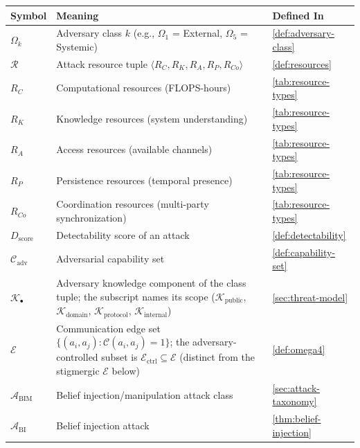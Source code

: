 \documentclass[
]{article}
\newcounter{none} %
\begin{document}
{\def\LTcaptype{none} %
\begin{longtable}[]{@{}
  >{\raggedright\arraybackslash}p{}
  >{\raggedright\arraybackslash}p{}
  >{\raggedright\arraybackslash}p{}@{}}
\toprule\noalign{}
\begin{minipage}[b]{\linewidth}\raggedright
Symbol
\end{minipage} & \begin{minipage}[b]{\linewidth}\raggedright
Meaning
\end{minipage} & \begin{minipage}[b]{\linewidth}\raggedright
Defined In
\end{minipage} \\
\midrule\noalign{}
\endhead
\bottomrule\noalign{}
\endlastfoot
\(\Omega_k\) & Adversary class \(k\) (e.g., \(\Omega_1\) = External,
\(\Omega_5\) = Systemic) & \cref{def:adversary-class} \\
\(\mathcal{R}\) & Attack resource tuple
\(\langle R_C, R_K, R_A, R_P, R_{Co} \rangle\) & \cref{def:resources} \\
\(R_C\) & Computational resources (FLOPS-hours) &
\cref{tab:resource-types} \\
\(R_K\) & Knowledge resources (system understanding) &
\cref{tab:resource-types} \\
\(R_A\) & Access resources (available channels) &
\cref{tab:resource-types} \\
\(R_P\) & Persistence resources (temporal presence) &
\cref{tab:resource-types} \\
\(R_{Co}\) & Coordination resources (multi-party synchronization) &
\cref{tab:resource-types} \\
\(D_{\text{score}}\) & Detectability score of an attack &
\cref{def:detectability} \\
\(\mathcal{C}_{\text{adv}}\) & Adversarial capability set &
\cref{def:capability-set} \\
\(\mathcal{K}_\bullet\) & Adversary knowledge component of the class
tuple; the subscript names its scope (\(\mathcal{K}_{\text{public}}\),
\(\mathcal{K}_{\text{domain}}\), \(\mathcal{K}_{\text{protocol}}\),
\(\mathcal{K}_{\text{internal}}\)) & \cref{sec:threat-model} \\
\(\mathcal{E}\) & Communication edge set
\(\{(a_i, a_j) : \mathcal{C}(a_i, a_j) = 1\}\); the adversary-controlled
subset is \(\mathcal{E}_{\text{ctrl}} \subseteq \mathcal{E}\) (distinct
from the stigmergic \(\mathcal{E}\) below) & \cref{def:omega4} \\
\(\mathcal{A}_{\text{BIM}}\) & Belief injection/manipulation attack
class & \cref{sec:attack-taxonomy} \\
\(\mathcal{A}_{\text{BI}}\) & Belief injection attack &
\cref{thm:belief-injection} \\
\end{longtable}
}
\end{document}
